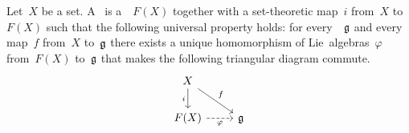 \begin{definition}
  Let~$X$ be a set.
  A~ is a~\liealgebra{$\kf$}~$F(X)$ together with a set-theoretic map~$i$ from~$X$ to~$F(X)$ such that the following universal property holds:
  for every~\liealgebra{$\kf$}~$\mathfrak{g}$ and every map~$f$ from~$X$ to~$\mathfrak{g}$ there exists a unique homomorphism of Lie~algebras~$\varphi$ from~$F(X)$ to~$\mathfrak{g}$ that makes the following triangular diagram commute.
  \[
    \begin{tikzcd}
      X
      \arrow{dr}[above right]{f}
      \arrow{d}[left]{i}
      &
      {}
      \\
      F(X)
      \arrow[dashed]{r}[below]{\varphi}
      &
      \glie
    \end{tikzcd}
  \]
\end{definition}


